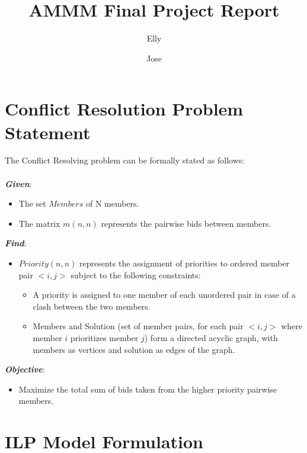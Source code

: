 \documentclass{article}
\title{\textbf{AMMM Final Project Report}}
\author[1]{Elly}
\author[2]{Jose}
\affil[1]{MIRI \href{mailto:@estudiantat.upc.edu}{@estudiantat.upc.edu}}
\affil[2]{MIRI \href{mailto:@estudiantat.upc.edu}{@estudiantat.upc.edu}}
\begin{document}
\maketitle


\tableofcontents

\newpage

\section{Conflict Resolution Problem Statement}

The Conflict Resolving problem can be formally stated as follows:\\
\\
\textbf{\textit{Given}}:
\begin{itemize}
    \item The set $Members$ of N members.
    \item The matrix $m(n, n)$ represents the pairwise bids between members.
\end{itemize}

\textbf{\textit{Find}}:
\begin{itemize}
    \item $Priority(n,n)$ represents the assignment of priorities to ordered member pair $<i,j>$ subject to the following constraints: \begin{itemize}
        \item A priority is assigned to one member of each unordered pair in case of a clash between the two members.
        \item Members and Solution (set of member pairs, for each pair $<i,j>$ where member $i$ prioritizes member $j$) form a directed acyclic graph, with members as vertices and solution as edges of the graph.
    \end{itemize}
\end{itemize}

\textbf{\textit{Objective}}:
\begin{itemize}
    \item Maximize the total sum of bids taken from the higher priority pairwise members.
\end{itemize}


\section{ILP Model Formulation}
\end{document}
